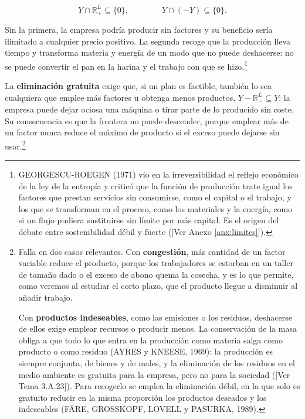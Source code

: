 \documentclass[10pt,a4paper]{article}
\newcommand{\authorfont}[1]{{\fontfamily{EBGaramond-TLF}\selectfont #1}}
\begin{document}
$$Y\cap\mathbb R^L_+\subseteq\{0\},\qquad\qquad Y\cap(-Y)\subseteq\{0\}.$$

Sin la primera, la empresa podría producir sin factores y su beneficio sería ilimitado a cualquier precio positivo. La segunda recoge que la producción lleva tiempo y transforma materia y energía de un modo que no puede deshacerse: no se puede convertir el pan en la harina y el trabajo con que se hizo.\footnote{%
    GEORGESCU-ROEGEN (1971) vio en la irreversibilidad el reflejo económico de la ley de la entropía y criticó que la función de producción trate igual los factores que prestan servicios sin consumirse, como el capital o el trabajo, y los que se transforman en el proceso, como los materiales y la energía, como si un flujo pudiera sustituirse sin límite por más capital. Es el origen del debate entre sostenibilidad débil y fuerte ([\authorfont{Ver Anexo \ref{anx:limites}}]).
}

La \textbf{eliminación gratuita} exige que, si un plan es factible, también lo sea cualquiera que emplee más factores u obtenga menos productos, $Y-\mathbb R^L_+\subseteq Y$: la empresa puede dejar ociosa una máquina o tirar parte de lo producido sin coste. Su consecuencia es que la frontera no puede descender, porque emplear más de un factor nunca reduce el máximo de producto si el exceso puede dejarse sin usar.\footnote{%
    Falla en dos casos relevantes. Con \textbf{congestión}, más cantidad de un factor variable reduce el producto, porque los trabajadores se estorban en un taller de tamaño dado o el exceso de abono quema la cosecha, y es lo que permite, como veremos al estudiar el corto plazo, que el producto llegue a disminuir al añadir trabajo. 
    
    Con \textbf{productos indeseables}, como las emisiones o los residuos, deshacerse de ellos exige emplear recursos o producir menos. La conservación de la masa obliga a que todo lo que entra en la producción como materia salga como producto o como residuo (AYRES y KNEESE, 1969): la producción es siempre conjunta, de bienes y de males, y la eliminación de los residuos en el medio ambiente es gratuita para la empresa, pero no para la sociedad ([\authorfont{Ver Tema 3.A.23}]). Para recogerlo se emplea la eliminación débil, en la que solo es gratuito reducir en la misma proporción los productos deseados y los indeseables (FÄRE, GROSSKOPF, LOVELL y PASURKA, 1989).
}
\end{document}
